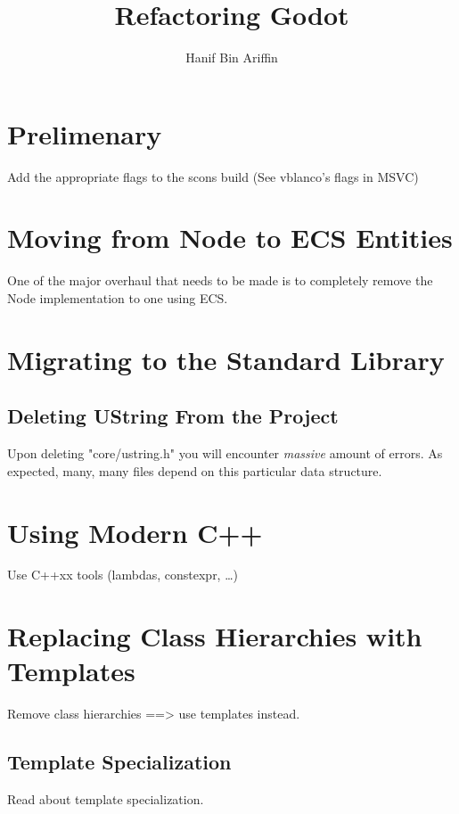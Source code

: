 \documentclass[a4paper,10pt]{book}
\title{Refactoring Godot}
\author{Hanif Bin Ariffin}
\begin{document}
\maketitle
\tableofcontents

\newpage
\section{Prelimenary}

Add the appropriate flags to the scons build (See vblanco's flags in MSVC)

\newpage
\section{Moving from Node to ECS Entities}

One of the major overhaul that needs to be made is to completely remove the Node implementation to one using ECS.

\newpage
\section{Migrating to the Standard Library}

\subsection{Deleting UString From the Project}

Upon deleting "core/ustring.h" you will encounter \textit{massive} amount of errors.
As expected, many, many files depend on this particular data structure.

\newpage
\section{Using Modern C++}

Use C++xx tools (lambdas, constexpr, \dots)

\newpage
\section{Replacing Class Hierarchies with Templates}

Remove class hierarchies ==> use templates instead.
\subsection{Template Specialization}

Read about template specialization.
\end{document}
